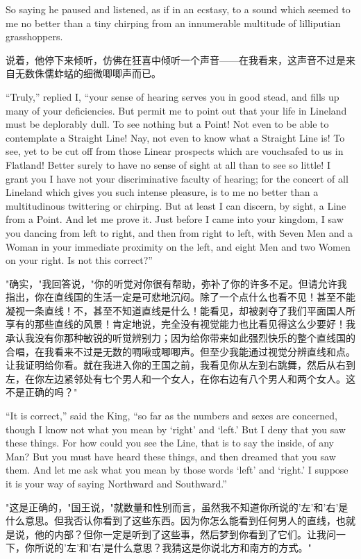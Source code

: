 \documentclass[12pt,UTF8]{ctexbook}
\begin{document}
So saying he paused and listened, as if in an ecstasy, to a sound which seemed to me no better than a tiny chirping from an innumerable multitude of lilliputian grasshoppers.

说着，他停下来倾听，仿佛在狂喜中倾听一个声音——在我看来，这声音不过是来自无数侏儒蚱蜢的细微唧唧声而已。

``Truly,'' replied I, ``your sense of hearing serves you in good stead, and fills up many of your deficiencies. But permit me to point out that your life in Lineland must be deplorably dull. To see nothing but a Point! Not even to be able to contemplate a Straight Line! Nay, not even to know what a Straight Line is! To see, yet to be cut off from those Linear prospects which are vouchsafed to us in Flatland! Better surely to have no sense of sight at all than to see so little! I grant you I have not your discriminative faculty of hearing; for the concert of all Lineland which gives you such intense pleasure, is to me no better than a multitudinous twittering or chirping. But at least I can discern, by sight, a Line from a Point. And let me prove it. Just before I came into your kingdom, I saw you dancing from left to right, and then from right to left, with Seven Men and a Woman in your immediate proximity on the left, and eight Men and two Women on your right. Is not this correct?''

"确实，"我回答说，"你的听觉对你很有帮助，弥补了你的许多不足。但请允许我指出，你在直线国的生活一定是可悲地沉闷。除了一个点什么也看不见！甚至不能凝视一条直线！不，甚至不知道直线是什么！能看见，却被剥夺了我们平面国人所享有的那些直线的风景！肯定地说，完全没有视觉能力也比看见得这么少要好！我承认我没有你那种敏锐的听觉辨别力；因为给你带来如此强烈快乐的整个直线国的合唱，在我看来不过是无数的啁啾或唧唧声。但至少我能通过视觉分辨直线和点。让我证明给你看。就在我进入你的王国之前，我看见你从左到右跳舞，然后从右到左，在你左边紧邻处有七个男人和一个女人，在你右边有八个男人和两个女人。这不是正确的吗？"

``It is correct,'' said the King, ``so far as the numbers and sexes are concerned, though I know not what you mean by `right' and `left.' But I deny that you saw these things. For how could you see the Line, that is to say the inside, of any Man? But you must have heard these things, and then dreamed that you saw them. And let me ask what you mean by those words `left' and `right.' I suppose it is your way of saying Northward and Southward.''

"这是正确的，"国王说，"就数量和性别而言，虽然我不知道你所说的'左'和'右'是什么意思。但我否认你看到了这些东西。因为你怎么能看到任何男人的直线，也就是说，他的内部？但你一定是听到了这些事，然后梦到你看到了它们。让我问一下，你所说的'左'和'右'是什么意思？我猜这是你说北方和南方的方式。"
\end{document}
